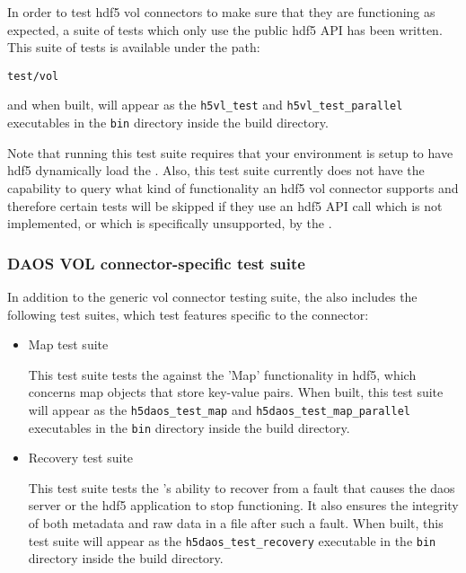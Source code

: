 \documentclass[../users_guide.tex]{subfiles}
\begin{document}
In order to test \acrshort{hdf5} \acrshort{vol} \glspl{connector} to make sure that they are functioning as expected, a suite of tests which only use the public \acrshort{hdf5} API has been written. This suite of tests is available under the path:

\texttt{test/vol}

and when built, will appear as the \texttt{h5vl\_test} and \texttt{h5vl\_test\_parallel} executables in the \texttt{bin} directory inside the build directory.

Note that running this test suite requires that your environment is setup to have \acrshort{hdf5} dynamically load the \dvc{}. Also, this test suite currently does not have the capability to query what kind of functionality an \acrshort{hdf5} \acrshort{vol} \gls{connector} supports and therefore certain tests will be skipped if they use an \acrshort{hdf5} API call which is not implemented, or which is specifically unsupported, by the \dvc.

\subsubsection{DAOS VOL connector-specific test suite}

In addition to the generic \acrshort{vol} \gls{connector} testing suite, the \dvc{} also includes the following test suites, which test features specific to the \gls{connector}:

\begin{itemize}
    \item \dvc{} Map test suite

    This test suite tests the \dvc{} against the 'Map' functionality in \acrshort{hdf5}, which concerns map objects that store key-value pairs. When built, this test suite will appear as the \texttt{h5daos\_test\_map} and \texttt{h5daos\_test\_map\_parallel} executables in the \texttt{bin} directory inside the build directory.

    \item \dvc{} Recovery test suite

    This test suite tests the \dvc's ability to recover from a fault that causes the \acrshort{daos} server or the \acrshort{hdf5} application to stop functioning. It also ensures the integrity of both metadata and raw data in a file after such a fault. When built, this test suite will appear as the \texttt{h5daos\_test\_recovery} executable in the \texttt{bin} directory inside the build directory.
\end{itemize}
\end{document}
